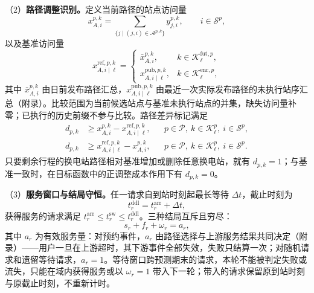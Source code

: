 \documentclass[12pt,a4paper,UTF8]{ctexart}
\begin{document}
（2）\textbf{路径调整识别。}定义当前路径的站点访问量
\begin{equation}
x_{A,i}^{p,k}
=
\sum_{\{j\mid(j,i)\in\mathcal A^{p,k}\}}y_{j,i}^{p,k},
\qquad i\in\mathcal S^p,
\label{eq:station_visit_indicator}
\end{equation}
以及基准访问量
\begin{equation}
x_{A,i\mid\ell}^{\mathrm{ref},p,k}
=
\begin{cases}
\bar x_{A,i}^{p,k},
&k\in\mathcal K_\ell^{\mathrm{fut},p},\\
x_{A,i\mid\ell}^{\mathrm{pub},p,k},
&k\in\mathcal K_\ell^{\mathrm{enr},p},
\end{cases}
\label{eq:reference_visit_indicator}
\end{equation}
其中 $\bar x_{A,i}^{p,k}$ 由日前发布路径汇总，$x_{A,i\mid\ell}^{\mathrm{pub},p,k}$ 由最近一次实际发布路径的未执行站序汇总（附录）。比较范围为当前候选站点与基准未执行站点的并集，缺失访问量补零；已执行的历史前缀不参与比较。路径差异标记满足
\begin{subequations}
\label{eq:path_adjustment_indicator}
\begin{align}
d_{p,k}
&\ge x_{A,i}^{p,k}-x_{A,i\mid\ell}^{\mathrm{ref},p,k},
&&p\in\mathcal P,\ k\in\mathcal K_\ell^p,\ i\in\mathcal S^p,\\
d_{p,k}
&\ge x_{A,i\mid\ell}^{\mathrm{ref},p,k}-x_{A,i}^{p,k},
&&p\in\mathcal P,\ k\in\mathcal K_\ell^p,\ i\in\mathcal S^p.
\end{align}
\end{subequations}
只要剩余行程的换电站路径相对基准增加或删除任意换电站，就有 $d_{p,k}=1$；与基准一致时，在目标函数中的正调整成本作用下有 $d_{p,k}=0$。

（3）\textbf{服务窗口与结局守恒。}任一请求自到站时刻起最长等待 $\Delta t$，截止时刻为
\begin{equation}
t_r^{\mathrm{ddl}}
=
t_r^{\mathrm{arr}}+\Delta t,
\label{eq:waiting_deadline}
\end{equation}
获得服务的请求满足 $t_r^{\mathrm{arr}}\le t_r^{\mathrm{sw}}\le t_r^{\mathrm{ddl}}$。三种结局互斥且穷尽：
\begin{equation}
s_r+f_r+\omega_r=a_r,
\label{eq:reservation_conservation_main}
\end{equation}
其中 $a_r$ 为有效服务量：对预约事件，$a_r$ 由路径选择与上游服务结果共同决定（附录）——用户一旦在上游超时，其下游事件全部失效，失败只结算一次；对随机请求和遗留等待请求，$a_r=1$。等待窗口跨预测期末的请求，本轮不能被判定失败或流失，只能在域内获得服务或以 $\omega_r=1$ 带入下一轮；带入的请求保留原到站时刻与原截止时刻，不重新计时。
\end{document}

